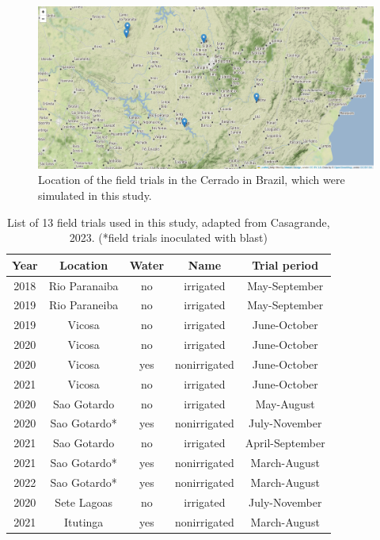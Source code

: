 \documentclass[11pt]{article}
\begin{document}
\begin{figure}[htbp]
\centering
\includegraphics[width=1\textwidth]{./figures/Brazil.png}
\caption{Location of the field trials in the Cerrado in Brazil, which were simulated in this study.}
\end{figure}

\begin{table}[htbp]
\caption{\label{list}List of 13 field trials used in this study, adapted from Casagrande, 2023. (*field trials inoculated with blast)}
\centering
\begin{tabular}{|ccccc|}
\hline
Year & Location & Water & Name & Trial period\\
\hline
\hline
2018 & Rio Paranaiba & no & irrigated & May-September\\
\hline
2019 & Rio Paraneiba & no & irrigated & May-September\\
\hline
2019 & Vicosa & no & irrigated & June-October\\
\hline
2020 & Vicosa & no & irrigated & June-October\\
\hline
2020 & Vicosa & yes & nonirrigated & June-October\\
\hline
2021 & Vicosa & no & irrigated & June-October\\
\hline
2020 & Sao Gotardo & no & irrigated & May-August\\
\hline
2020 & Sao Gotardo* & yes & nonirrigated & July-November\\
\hline
2021 & Sao Gotardo & no & irrigated & April-September\\
\hline
2021 & Sao Gotardo* & yes & nonirrigated & March-August\\
\hline
2022 & Sao Gotardo* & yes & nonirrigated & March-August\\
\hline
2020 & Sete Lagoas & no & irrigated & July-November\\
\hline
2021 & Itutinga & yes & nonirrigated & March-August\\
\hline
\end{tabular}
\end{table}
\end{document}
